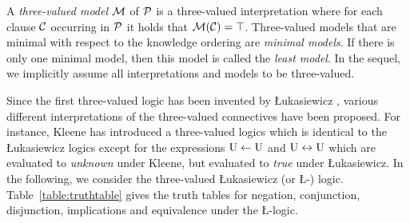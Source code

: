\begin{definition}
A \textit{three-valued model} $\mathcal{M}$ of $\mathcal{P}$ is a three-valued interpretation where for each clause $\mathcal{C}$ occurring in $\mathcal{P}$ it holds that $\mathcal{M}(\mathcal{C}) = \top$. Three-valued models that are minimal with respect to the knowledge ordering are \textit{minimal models}. If there is only one minimal model, then this model is called the \textit{least model}. In the sequel, we implicitly assume all interpretations and models to be three-valued.
\end{definition}

Since the first three-valued logic has been invented by {\L}ukasiewicz \cite{lukasiewicz1968three}, various different interpretations of the three-valued connectives have been proposed. For instance, Kleene has introduced a three-valued logics \cite{kleene1952introduction} which is identical to the {\L}ukasiewicz logics except for the expressions $\mbox{\normalfont U} \leftarrow \mbox{\normalfont U}$ and $\mbox{\normalfont U} \leftrightarrow \mbox{\normalfont U}$ which are evaluated to \textit{unknown} under Kleene, but evaluated to \textit{true} under {\L}ukasiewicz. In the following, we consider the three-valued {\L}ukasiewicz (or \L-) logic. Table~\ref{table:truthtable} gives the truth tables for negation, conjunction, disjunction, implications and equivalence under the \L-logic.

